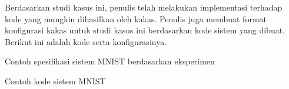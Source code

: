 Berdasarkan studi kasus ini, penulis telah melakukan implementasi terhadap kode yang mungkin dihasilkan oleh kakas.
Penulis juga membuat format konfigurasi kakas untuk studi kasus ini berdasarkan kode sistem yang dibuat.
Berikut ini adalah kode serta konfigurasinya.

\begin{code}
	\caption{Contoh spesifikasi sistem MNIST berdasarkan eksperimen}
	\label{listing:16}
\end{code}

\begin{code}
	\caption{Contoh kode sistem MNIST}
	\label{listing:17}
\end{code}

